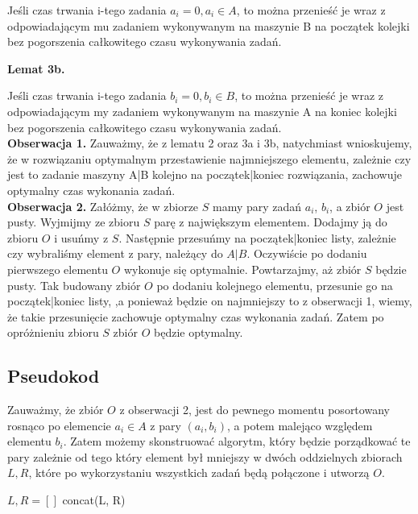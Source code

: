 \documentclass[11pt, wide]{article}
\begin{document}
    Jeśli czas trwania i-tego zadania $a_i = 0, a_i \in A$, to można przenieść je wraz z 
    odpowiadającym mu zadaniem wykonywanym na maszynie B na początek kolejki bez pogorszenia całkowitego czasu wykonywania zadań.
    
    
    \textbf{Lemat 3b.}

    Jeśli czas trwania i-tego zadania $b_i = 0, b_i \in B$, to można przenieść je wraz z 
    odpowiadającym my zadaniem wykonywanym na maszynie A na koniec kolejki bez pogorszenia całkowitego czasu wykonywania zadań.
    \\

    \textbf{Obserwacja 1.}
    Zauważmy, że z lematu 2 oraz 3a i 3b, natychmiast wnioskujemy, że w rozwiązaniu optymalnym przestawienie 
    najmniejszego elementu, zależnie czy jest to zadanie maszyny A|B kolejno na początek|koniec rozwiązania, zachowuje
    optymalny czas wykonania zadań.
    \\

    \textbf{Obserwacja 2.}
    Załóżmy, że w zbiorze $S$ mamy pary zadań $a_i$, $b_i$, a zbiór $O$ jest pusty. Wyjmijmy ze zbioru $S$ parę z największym elementem.
    Dodajmy ją do zbioru $O$ i usuńmy z $S$. Następnie przesuńmy na początek|koniec listy, zależnie czy wybraliśmy element z pary, należący do $A|B$.
    Oczywiście po dodaniu pierwszego elementu $O$ wykonuje się optymalnie. Powtarzajmy, aż zbiór $S$ będzie pusty. 
    Tak budowany zbiór $O$ po dodaniu kolejnego elementu, przesunie go na początek|koniec listy,
    ,a ponieważ będzie on najmniejszy to z obserwacji 1, wiemy, że takie przesunięcie zachowuje optymalny czas wykonania zadań. 
    Zatem po opróżnieniu zbioru $S$ zbiór $O$ będzie optymalny.

    \subsection{Pseudokod}

    Zauważmy, że zbiór $O$ z obserwacji 2, jest do pewnego momentu posortowany
    rosnąco po elemencie $a_i \in A$ z pary $(a_i, b_i)$, a potem malejąco względem
    elementu $b_i$. Zatem możemy skonstruować algorytm, który będzie porządkować te 
    pary zależnie od tego który element był mniejszy w dwóch oddzielnych zbiorach $L, R$,
    które po wykorzystaniu wszystkich zadań będą połączone i utworzą $O$.


    \begin{algorithm}[H]
     $L,R = []$\;
     \Return concat(L, R)
    \end{algorithm}
    
\end{document}
